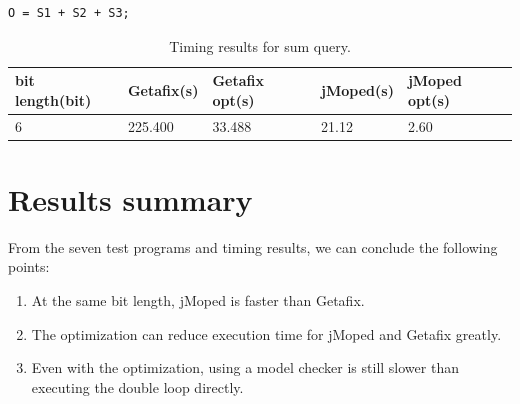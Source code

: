 \lstset{language=C}  
\begin{lstlisting}[float=!h, caption={Sum query test program.},label=lst:sum]
O = S1 + S2 + S3;
\end{lstlisting}

\begin{table}[!h]
\centering
\begin{tabular}{|l|l|l|l|l|}
\hline
{bit length(bit)} & Getafix(s) & {Getafix opt(s)} & jMoped(s) & {jMoped opt(s)} \\ \hline
6 & 225.400 & 33.488 & 21.12 & 2.60	\\ \hline
\end{tabular}
\caption{Timing results for sum query.}
\label{tbl:sum}
\end{table}

\section{Results summary}
From the seven test programs and timing results, we can conclude the following points:
\begin{enumerate}
\item At the same bit length, jMoped is faster than Getafix. 
\item The optimization can reduce execution time for jMoped and Getafix greatly.
\item Even with the optimization, using a model checker is still slower than executing the double loop directly.
\end{enumerate}

